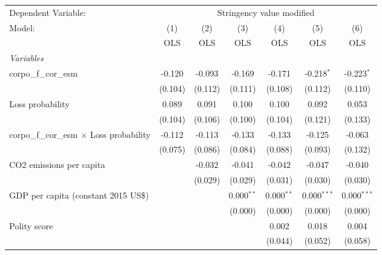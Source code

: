 
\begingroup
\centering
\begin{tabular}{lcccccc}
   \toprule
   Dependent Variable: & \multicolumn{6}{c}{Stringency value modified}\\
   Model:                                           & (1)     & (2)     & (3)          & (4)          & (5)           & (6)\\  
                                                    &  OLS    & OLS     & OLS          & OLS          & OLS           & OLS\\  
   \midrule
   \emph{Variables}\\
   corpo\_f\_cor\_esm                               & -0.120  & -0.093  & -0.169       & -0.171       & -0.218$^{*}$  & -0.223$^{*}$\\   
                                                    & (0.104) & (0.112) & (0.111)      & (0.108)      & (0.112)       & (0.110)\\   
   Loss probability                                 & 0.089   & 0.091   & 0.100        & 0.100        & 0.092         & 0.053\\   
                                                    & (0.104) & (0.106) & (0.100)      & (0.104)      & (0.121)       & (0.133)\\   
   corpo\_f\_cor\_esm $\times$ Loss probability     & -0.112  & -0.113  & -0.133       & -0.133       & -0.125        & -0.063\\   
                                                    & (0.075) & (0.086) & (0.084)      & (0.088)      & (0.093)       & (0.132)\\   
   CO2 emissions per capita                         &         & -0.032  & -0.041       & -0.042       & -0.047        & -0.040\\   
                                                    &         & (0.029) & (0.029)      & (0.031)      & (0.030)       & (0.030)\\   
   GDP per capita (constant 2015 US\$)              &         &         & 0.000$^{**}$ & 0.000$^{**}$ & 0.000$^{***}$ & 0.000$^{***}$\\   
                                                    &         &         & (0.000)      & (0.000)      & (0.000)       & (0.000)\\   
   Polity score                                     &         &         &              & 0.002        & 0.018         & 0.004\\   
                                                    &         &         &              & (0.044)      & (0.052)       & (0.058)\\   

\end{tabular}
